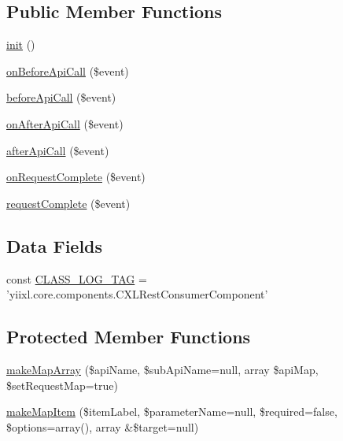 \subsection*{Public Member Functions}
\begin{DoxyCompactItemize}
\item 
\hyperlink{classCXLRestConsumerComponent_a4be4055f3361d4800e16bc2e2e38cda6}{init} ()
\item 
\hyperlink{classCXLRestConsumerComponent_a6366c3940c120c34aa6cf7f4cc4df2c8}{onBeforeApiCall} (\$event)
\item 
\hyperlink{classCXLRestConsumerComponent_a8d1ffc45e66988165bc31c6135830fd3}{beforeApiCall} (\$event)
\item 
\hyperlink{classCXLRestConsumerComponent_aababdbe8ed9e71593b4619ca5e7b57f3}{onAfterApiCall} (\$event)
\item 
\hyperlink{classCXLRestConsumerComponent_a5a5d728f3727da5e41589b0e72b0bd33}{afterApiCall} (\$event)
\item 
\hyperlink{classCXLRestConsumerComponent_aa82445f7b6bd99b5b837b1ee92b3d3bf}{onRequestComplete} (\$event)
\item 
\hyperlink{classCXLRestConsumerComponent_abcd54b473a65fd055b561cecc39d7737}{requestComplete} (\$event)
\end{DoxyCompactItemize}
\subsection*{Data Fields}
\begin{DoxyCompactItemize}
\item 
const \hyperlink{classCXLRestConsumerComponent_aa607ab5e557e6ebb60b85c5a20ad067f}{CLASS\_\-LOG\_\-TAG} = 'yiixl.core.components.CXLRestConsumerComponent'
\end{DoxyCompactItemize}
\subsection*{Protected Member Functions}
\begin{DoxyCompactItemize}
\item 
\hyperlink{classCXLRestConsumerComponent_a144fe38756c5927205e8c750f8da768e}{makeMapArray} (\$apiName, \$subApiName=null, array \$apiMap, \$setRequestMap=true)
\item 
\hyperlink{classCXLRestConsumerComponent_a994fbc009e9ddb1dee7f559c53a12e7d}{makeMapItem} (\$itemLabel, \$parameterName=null, \$required=false, \$options=array(), array \&\$target=null)
\end{DoxyCompactItemize}
